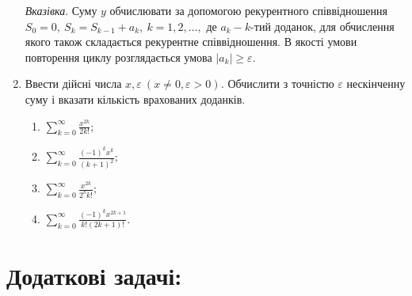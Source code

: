 \documentclass[a5paper,titlepage,openany,twoside,draft]{book_unv}%
\makeatletter
\newcommand{\xslalph}[1]{\expandafter\@xslalph\csname c@#1\endcsname}
\newcommand{\@xslalph}[1]{%
    \ifcase#1\or а\or б\or в\or г\or д\or e\or є\or ж\or з\or i%
    \or й\or к\or л\or м\or н\or о\or п\or р\or с\or т%
    \or у\or ф\or х\or ц\or ч\or ш\or ю\or я\or аа\or бб\or вв%
    \else\@ctrerr\fi%
}
\makeatother
\begin{document}
\begin{enumerate}
\begin{enumerate}[label=\xslalph*)]
\end{enumerate}

\emph{\emph{Вказівка}}. Суму $y$ обчислювати за допомогою
рекурентного співвідношення
\(S_{0} = 0,\ S_{k} = S_{k - 1} + a_{k},\ k = 1,2,\ldots,\) де
\(a_{k} - k\)-тий доданок, для обчислення якого також складається
рекурентне співвідношення. В якості умови повторення циклу розглядається
умова \(\left| a_{k} \right| \geq \varepsilon.\)

\item
  Ввести дійсні числа
  \(x,\varepsilon\ (x \neq 0,\varepsilon > 0)\)\emph{.} Обчислити з
  точністю \(\varepsilon\) нескінченну суму і вказати кількість
  врахованих доданків.
  \begin{multicols}{2}
\begin{enumerate}[label=\xslalph*)]
\item \(\sum\limits_{k = 0}^{\infty}\frac{x^{2k}}{2k!};\) 
\item \(\sum\limits_{k = 0}^{\infty}\frac{(-1)^{k}x^{k}}{(k + 1)^{2}};\)
\item \(\sum\limits_{k = 0}^{\infty}\frac{x^{2k}}{2^{k}k!};\) 
\item \(\sum\limits_{k = 0}^{\infty}\frac{(-1)^{k}x^{2k + 1}}{k!(2k + 1)!}.\)
\end{enumerate}
 \end{multicols}

\end{enumerate}

\section{Додаткові задачі:}
\end{document}
